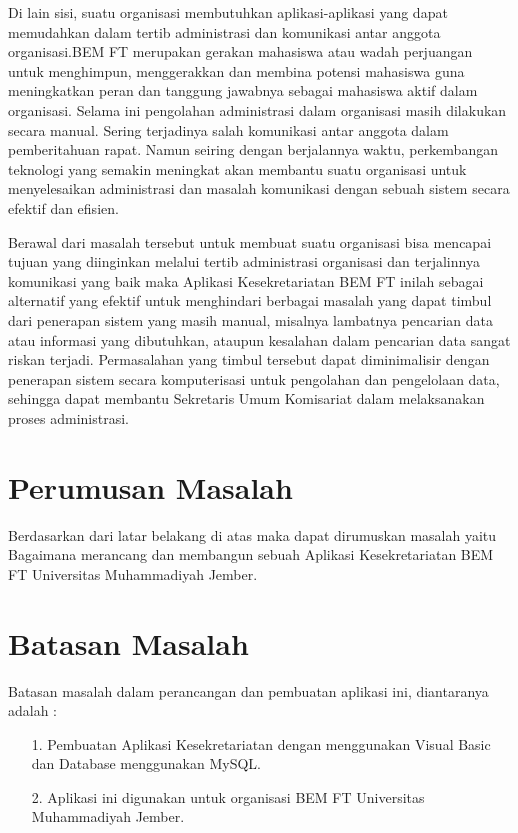 \documentclass{jtetiproposalskripsi}
\begin{document}
Di lain sisi, suatu organisasi membutuhkan aplikasi-aplikasi yang dapat memudahkan dalam tertib administrasi dan komunikasi antar anggota organisasi.BEM FT merupakan gerakan mahasiswa atau wadah perjuangan untuk menghimpun, menggerakkan dan membina potensi mahasiswa guna meningkatkan peran dan tanggung jawabnya sebagai  mahasiswa aktif dalam organisasi. Selama ini pengolahan administrasi dalam organisasi masih dilakukan secara manual. Sering terjadinya salah komunikasi antar anggota dalam pemberitahuan rapat. Namun seiring dengan berjalannya waktu, perkembangan teknologi yang semakin meningkat akan membantu suatu organisasi untuk menyelesaikan administrasi dan masalah komunikasi dengan sebuah sistem secara efektif dan efisien.

Berawal dari masalah tersebut untuk membuat suatu organisasi bisa mencapai tujuan yang diinginkan melalui tertib administrasi organisasi dan terjalinnya komunikasi yang baik maka Aplikasi Kesekretariatan BEM FT inilah sebagai alternatif yang efektif untuk menghindari berbagai masalah yang dapat timbul dari penerapan sistem yang masih manual, misalnya lambatnya pencarian data atau informasi yang dibutuhkan, ataupun kesalahan dalam pencarian data sangat riskan terjadi. Permasalahan yang timbul tersebut dapat diminimalisir dengan penerapan sistem secara komputerisasi untuk pengolahan dan pengelolaan data, sehingga dapat membantu Sekretaris Umum Komisariat dalam melaksanakan proses administrasi.

\section{Perumusan Masalah}

Berdasarkan dari latar belakang di atas maka dapat dirumuskan masalah yaitu Bagaimana merancang dan membangun sebuah Aplikasi Kesekretariatan BEM FT Universitas Muhammadiyah Jember.

\section{Batasan Masalah}

Batasan masalah dalam perancangan dan pembuatan aplikasi ini, diantaranya adalah :
\begin{itemize}
\item[1.] Pembuatan Aplikasi Kesekretariatan dengan menggunakan Visual Basic dan Database menggunakan MySQL.
\item[2.] Aplikasi ini digunakan untuk organisasi BEM FT Universitas Muhammadiyah Jember.
\end{itemize}
\end{document}
